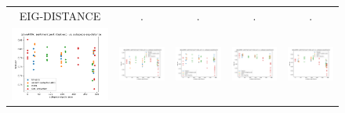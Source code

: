 \begin{figure}
\begin{tabular}{@{\hskip -0.0in}c@{\hskip -0.0in}c@{\hskip -0.0in}c@{\hskip -0.0in}c@{\hskip -0.0in}c@{\hskip -0.0in}}
		EIG-DISTANCE & . & . & . & .\\
		\includegraphics[width=.2\linewidth]{figures/glove400k_sentiment_mr_test-acc_vs_subspace-eig-distance_linx.pdf} &
		\includegraphics[width=.2\linewidth]{figures/glove400k_sentiment_subj_test-acc_vs_subspace-eig-distance_linx.pdf} &
		\includegraphics[width=.2\linewidth]{figures/glove400k_sentiment_cr_test-acc_vs_subspace-eig-distance_linx.pdf} &
		\includegraphics[width=.2\linewidth]{figures/glove400k_sentiment_sst_test-acc_vs_subspace-eig-distance_linx.pdf} &
		\includegraphics[width=.2\linewidth]{figures/glove400k_sentiment_mpqa_test-acc_vs_subspace-eig-distance_linx.pdf} \\
		

\end{tabular}
\end{figure}

